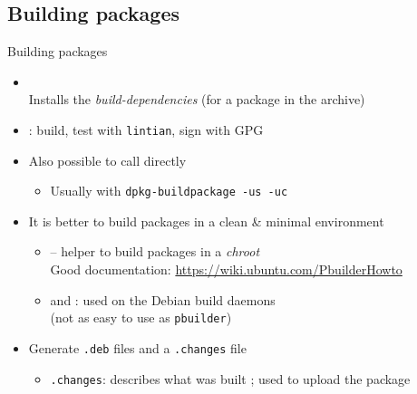 \documentclass[10pt,final]{beamer}
\begin{document}
\subsection{Building packages}
\begin{frame}{Building packages}
\begin{itemize}
	\item {}\\
		Installs the \textsl{build-dependencies} (for a package in the archive)
		
		\br
	\item {}: build, test with \texttt{lintian}, sign with GPG
		\br
	\item Also possible to call  directly
		\begin{itemize}
			\item Usually with \texttt{dpkg-buildpackage -us -uc}
		\end{itemize}
		\br
	\item It is better to build packages in a clean \& minimal environment
		\begin{itemize}
			\item {} -- helper to build packages in a \textsl{chroot}\\
				Good documentation: \url{https://wiki.ubuntu.com/PbuilderHowto}
			\hbr
		\item {} and : used on the Debian build daemons\\
			(not as easy to use as \texttt{pbuilder})
		\end{itemize}
		\br
	\item Generate \texttt{.deb} files and a \texttt{.changes} file
		\begin{itemize}
			\item \texttt{.changes}: describes what was built ; used to upload the package
		\end{itemize}
\end{itemize}
\end{frame}
\end{document}
